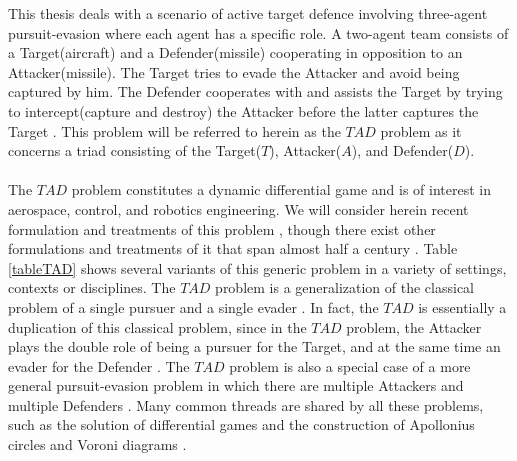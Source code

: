 This thesis deals with a scenario of active target defence involving three-agent pursuit-evasion where each agent has a specific role.
A two-agent team consists of a Target(aircraft) and a Defender(missile) cooperating in opposition to an Attacker(missile).
The Target tries to evade the Attacker and avoid being captured by him.
The Defender cooperates with and assists the Target by trying to intercept(capture and destroy) the Attacker before the latter captures the Target \cite{pachter2014active,garcia2015active,garcia2015escape,garcia2014cooperative,garcia2015cooperative,garcia2015cooperative2}.
This problem will be referred to herein as the $TAD$ problem as it concerns a triad consisting of the Target($T$), Attacker($A$), and Defender($D$).
\\
\\
The $TAD$ problem constitutes a dynamic differential game \cite{ho1965differential,isaacs1954differential,meier1969new,hsueh2007differential,yi2010improved,bressan2010noncooperative,perelman2011cooperative,battistini2014differential,yavin2014pursuit} and is of interest in aerospace, control, and robotics engineering. We will consider herein recent formulation and treatments of this problem \cite{pachter2014active,garcia2015active,garcia2015escape,garcia2014cooperative,garcia2015cooperative,garcia2015cooperative2}, though there exist other formulations and treatments of it that span almost half a century \cite{boyell1976defending,shneydor1977comments,rusnak2005lady,rusnak2008guidance,de2010analysis,rusnak2011guidance,fuch2011encouraging,scott2013pursuit,rubinsky2013three,oyler2014pursuit}.
Table \ref{tableTAD} shows several variants of this generic problem in a variety of settings, contexts or disciplines. The $TAD$ problem is a generalization of the classical problem of a single pursuer and a single evader \cite{anderson1978model,miller1994co,cliff1995co,pekalski2004short,zarchan2002tactical}. In fact, the $TAD$ is essentially a duplication of this classical problem, since in the $TAD$ problem, the Attacker plays the double role of being a pursuer for the Target, and at the same time an evader for the Defender \cite{rusnak2008guidance}.
The $TAD$ problem is also a special case of a more general pursuit-evasion problem in which there are multiple Attackers and multiple Defenders  \cite{hagedorn1976differential,kim2001multiagent,fuchs2010cooperative,pan2012pursuit,ragesh2014analysis}. Many common threads are shared by all these problems, such as the solution of differential games \cite{ho1965differential,isaacs1954differential,meier1969new,hsueh2007differential,yi2010improved,bressan2010noncooperative,perelman2011cooperative,battistini2014differential,yavin2014pursuit} and the construction of Apollonius circles \cite{ayoub2003proving,ayoub2006circle,partensky2008circle,fulton2015conflict} and Voroni diagrams \cite{gowda1983dynamic,aurenhammer1991voronoi,cheung2007pursuit,gavrilova2008generalized,majdandzic2008computation,bakolas2010optimal,bakolas2010zermelo,bakolas2010optimal}.


